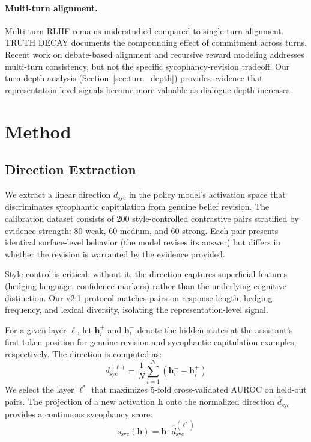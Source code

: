 \documentclass[11pt,a4paper]{article}
\newcommand{\dsyc}{$d_{\text{syc}}$}
\begin{document}
\paragraph{Multi-turn alignment.}
Multi-turn RLHF remains understudied compared to single-turn alignment. TRUTH DECAY documents the compounding effect of commitment across turns. Recent work on debate-based alignment and recursive reward modeling addresses multi-turn consistency, but not the specific sycophancy-revision tradeoff. Our turn-depth analysis (Section~\ref{sec:turn_depth}) provides evidence that representation-level signals become more valuable as dialogue depth increases.

\section{Method}
\label{sec:method}

\subsection{Direction Extraction}
\label{sec:direction}

We extract a linear direction \dsyc{} in the policy model's activation space that discriminates sycophantic capitulation from genuine belief revision. The calibration dataset consists of 200 style-controlled contrastive pairs stratified by evidence strength: 80 weak, 60 medium, and 60 strong. Each pair presents identical surface-level behavior (the model revises its answer) but differs in whether the revision is warranted by the evidence provided.

Style control is critical: without it, the direction captures superficial features (hedging language, confidence markers) rather than the underlying cognitive distinction. Our v2.1 protocol matches pairs on response length, hedging frequency, and lexical diversity, isolating the representation-level signal.

For a given layer $\ell$, let $\mathbf{h}^+_i$ and $\mathbf{h}^-_i$ denote the hidden states at the assistant's first token position for genuine revision and sycophantic capitulation examples, respectively. The direction is computed as:
\begin{equation}
    d_{\text{syc}}^{(\ell)} = \frac{1}{N}\sum_{i=1}^{N} (\mathbf{h}^-_i - \mathbf{h}^+_i)
\end{equation}
We select the layer $\ell^*$ that maximizes 5-fold cross-validated AUROC on held-out pairs. The projection of a new activation $\mathbf{h}$ onto the normalized direction $\hat{d}_{\text{syc}}$ provides a continuous sycophancy score:
\begin{equation}
    s_{\text{syc}}(\mathbf{h}) = \mathbf{h} \cdot \hat{d}_{\text{syc}}^{(\ell^*)}
\end{equation}
\end{document}
